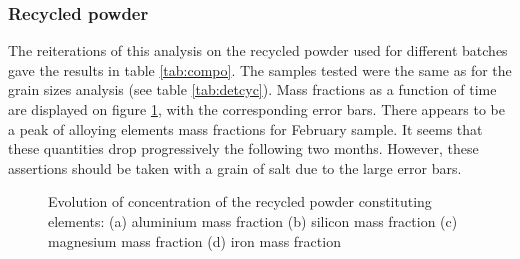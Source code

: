 \subsubsection{Recycled powder}

The reiterations of this analysis on the recycled powder used for different batches gave the results in table \ref{tab:compo}. The samples tested were the same as for the grain sizes analysis (see table \ref{tab:detcyc}). Mass fractions as a function of time are displayed on figure \ref{fig:Compo}, with the corresponding error bars. There appears to be a peak of alloying elements mass fractions for February sample. It seems that these quantities drop progressively the following two months. However, these assertions should be taken with a grain of salt due to the large error bars.

\begin{figure}[ht]
\centering
\noindent{}
\decoRule
\caption[Evolution of concentration of the recycled powder constituting elements: (a) aluminium mass fraction (b) silicon mass fraction (c) magnesium mass fraction (d) iron mass fraction]{Evolution of concentration of the recycled powder constituting elements: (a) aluminium mass fraction (b) silicon mass fraction (c) magnesium mass fraction (d) iron mass fraction}
\label{fig:Compo}
\end{figure} 


